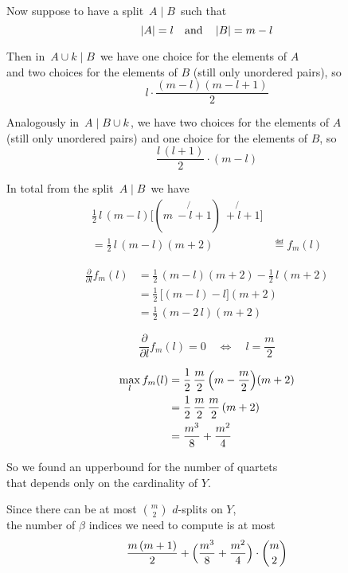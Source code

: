 \documentclass[./main.tex]{subfiles}
\begin{document}
Now suppose to have a split $\, A \mathbin{|} B \,$ such that
\[ \left\lvert A\right\rvert = l \quad \text{and} \quad \left\lvert B\right\rvert = m - l \]

Then in $\, A \cup k \mathbin{|} B \,$ we have one choice for the elements of $A$ \\
\bsp and two choices for the elements of $B$ (still only unordered pairs), so
\[ l \cdot \frac{(m - l)(m - l + 1)}{2} \]

Analogously in $\, A \mathbin{|} B \cup k \,$, we have two choices for the elements of $A$ \\
\bsp  (still only unordered pairs) and one choice for the elements of $B$, so
\[ \frac{l\,(l + 1)}{2} \cdot (m - l) \]

In total from the split $\, A \mathbin{|} B \,$ we have
\begin{align*}
    \frac{1}{2}\, l\,(m - l) \bigl[ (m \ -\! \not{l} + 1) \ +\! \not{l} + 1 \bigr]& \\
    = \frac{1}{2}\, l\,(m - l)(m + 2)& \eqdef f_m(l)
\end{align*}

\begin{align*}
    \frac{\partial}{\partial l} f_m(l) &= \frac{1}{2}\, (m - l)(m + 2) - \frac{1}{2}\, l\,(m + 2) \\
    &= \frac{1}{2}\, \bigl[ (m - l) - l \bigr] (m + 2) \\
    &= \frac{1}{2}\, (m - 2\,l)(m + 2)
\end{align*}

\[ \frac{\partial}{\partial l} f_m(l) = 0 \quad \iff \quad l = \frac{m}{2} \]

\begin{align*}
    \max_{l} {f_m(l)} &= \frac{1}{2}\, \frac{m}{2}\, \Bigl( m - \frac{m}{2} \Bigr) (m + 2) \\
    &= \frac{1}{2}\, \frac{m}{2}\, \frac{m}{2}\, (m + 2) \\
    &= \frac{m^3}{8} + \frac{m^2}{4}
\end{align*}

So we found an upperbound for the number of quartets \\
\bsp that depends only on the cardinality of $Y$.

Since there can be at most $\binom{m}{2}$ $d$-splits on $Y$, \\[1pt]
\bsp the number of  $\beta$ indices we need to compute is at most
\[ \frac{m\,(m + 1)}{2} + \Bigl( \frac{m^3}{8} + \frac{m^2}{4} \Bigr) \cdot \binom{m}{2} \]
\end{document}
